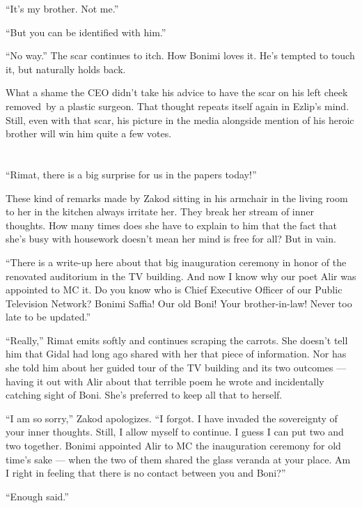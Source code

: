 \documentclass[twoside,11pt,openany]{book}
\begin{document}
``It's my brother. Not me.''

``But you can be identified with him.''

``No way.'' The scar continues to itch. How Bonimi loves it. He's tempted to touch it, but
naturally holds back.

What a shame the CEO didn't take his advice to have the scar on his left cheek
removed~by a plastic surgeon. That
thought repeats itself again in Ezlip's mind. Still, even with that scar, his picture in the media alongside mention of
his heroic brother will win him quite a few votes.



\chapter{}

``Rimat, there is a big surprise for us in the papers today!''

These kind of remarks made by Zakod sitting in his armchair in the living room to her in the kitchen always irritate
her. They break her stream of inner thoughts. { }How many times does
she have to explain{ }to him that the fact that she's busy with housework
doesn't mean her mind is free for all? But in vain.

``There is a write-up here about that big inauguration ceremony in honor of the renovated auditorium in the
TV building. And now I know why our poet Alir was appointed to MC it. Do you know who is Chief Executive Officer of
our Public Television Network? Bonimi Saffia! Our old Boni! Your brother-in-law! Never too late to be
updated.''

``Really,'' Rimat emits softly and continues scraping the carrots. She doesn't tell him that
Gidal had long ago shared with her that piece of information. Nor has she told him about her guided tour of the TV
building and its two outcomes --- having it out with Alir about that terrible poem he wrote and incidentally catching
sight of Boni. She's preferred to keep all that to herself.

``I am so sorry,'' Zakod apologizes. ``I forgot. I have invaded the sovereignty
of your inner thoughts. Still, I allow myself to continue. I guess I can put two and two together. Bonimi appointed
Alir to MC the inauguration ceremony for old time{'s} sake --- when the two of them shared the glass veranda at your
place. Am I right in feeling that there is no contact between you and Boni?''

``Enough said.''
\end{document}
